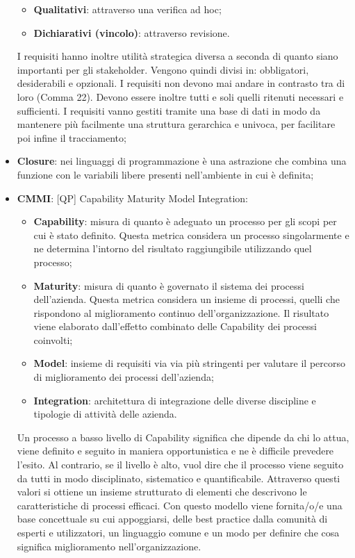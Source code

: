 \begin{itemize}
\begin{itemize}
				\item \textbf{Qualitativi}: attraverso una verifica ad hoc;
				\item \textbf{Dichiarativi (vincolo)}: attraverso revisione.
			\end{itemize}
			\noindent
		I requisiti hanno inoltre utilità strategica diversa a seconda di quanto siano importanti per gli stakeholder. Vengono quindi divisi in: obbligatori, desiderabili e opzionali. I requisiti non devono mai andare in contrasto tra di loro (Comma 22). Devono essere inoltre tutti e soli quelli ritenuti necessari e sufficienti. \newline
		I requisiti vanno gestiti tramite una base di dati in modo da mantenere più facilmente una struttura gerarchica e univoca, per facilitare poi infine il tracciamento;

		\item \textbf{Closure}: nei linguaggi di programmazione è una astrazione che combina una funzione con le variabili libere presenti nell'ambiente in cui è definita;
		\item \textbf{CMMI}: [QP] Capability Maturity Model Integration:
			\begin{itemize}
				\item \textbf{Capability}: misura di quanto è adeguato un processo per gli scopi per cui è stato definito. Questa metrica considera un processo singolarmente e ne determina l'intorno del risultato raggiungibile utilizzando quel processo;
				\item \textbf{Maturity}: misura di quanto è governato il sistema dei processi dell'azienda. Questa metrica considera un insieme di processi, quelli che rispondono al miglioramento continuo dell'organizzazione. Il risultato viene elaborato dall'effetto combinato delle Capability dei processi coinvolti;
				\item \textbf{Model}: insieme di requisiti via via più stringenti per valutare il percorso di miglioramento dei processi dell'azienda;
				\item \textbf{Integration}: architettura di integrazione delle diverse discipline e tipologie di attività delle azienda.
			\end{itemize}
			\noindent
		Un processo a basso livello di Capability significa che dipende da chi lo attua, viene definito e seguito in maniera opportunistica e ne è difficile prevedere l'esito. Al contrario, se il livello è alto, vuol dire che il processo viene seguito da tutti in modo disciplinato, sistematico e quantificabile. Attraverso questi valori si ottiene un insieme strutturato di elementi che descrivono le caratteristiche di processi efficaci. Con questo modello viene fornita/o/e una base concettuale su cui appoggiarsi, delle best practice dalla comunità di esperti e utilizzatori, un linguaggio comune e un modo per definire che cosa significa miglioramento nell'organizzazione. \newline

\end{itemize}
